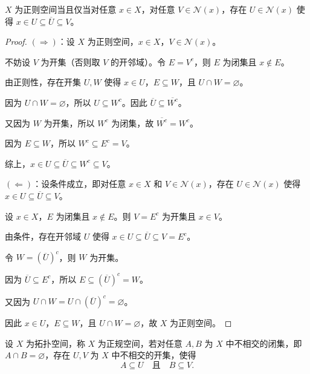 \documentclass[lang=cn,a4paper,newtx,figureplace=section,tableplace=section]{elegantbook}
\begin{document}
\begin{proposition}\label{prop:regular-characterization}
$X$ 为正则空间当且仅当对任意 $x \in X$，对任意 $V \in \mathcal{N}(x)$，存在 $U \in \mathcal{N}(x)$ 使得 $x \in U \subseteq \overline{U} \subseteq V$。
\end{proposition}
\begin{proof}
$(\Rightarrow)$：设 $X$ 为正则空间，$x \in X$，$V \in \mathcal{N}(x)$。

不妨设 $V$ 为开集（否则取 $V$ 的开邻域）。令 $E = V^c$，则 $E$ 为闭集且 $x \notin E$。

由正则性，存在开集 $U, W$ 使得 $x \in U$，$E \subseteq W$，且 $U \cap W = \varnothing$。

因为 $U \cap W = \varnothing$，所以 $U \subseteq W^c$。因此 $\overline{U} \subseteq \overline{W^c}$。

又因为 $W$ 为开集，所以 $W^c$ 为闭集，故 $\overline{W^c} = W^c$。

因为 $E \subseteq W$，所以 $W^c \subseteq E^c = V$。

综上，$x \in U \subseteq \overline{U} \subseteq W^c \subseteq V$。

$(\Leftarrow)$：设条件成立，即对任意 $x \in X$ 和 $V \in \mathcal{N}(x)$，存在 $U \in \mathcal{N}(x)$ 使得 $x \in U \subseteq \overline{U} \subseteq V$。

设 $x \in X$，$E$ 为闭集且 $x \notin E$。则 $V = E^c$ 为开集且 $x \in V$。

由条件，存在开邻域 $U$ 使得 $x \in U \subseteq \overline{U} \subseteq V = E^c$。

令 $W = (\overline{U})^c$，则 $W$ 为开集。

因为 $\overline{U} \subseteq E^c$，所以 $E \subseteq (\overline{U})^c = W$。

又因为 $U \cap W = U \cap (\overline{U})^c = \varnothing$。

因此 $x \in U$，$E \subseteq W$，且 $U \cap W = \varnothing$，故 $X$ 为正则空间。
\end{proof}

\begin{definition}[正规空间]\label{def:normal-space}
设 $X$ 为拓扑空间，称 $X$ 为正规空间，若对任意 $A, B$ 为 $X$ 中不相交的闭集，即 $A \cap B = \varnothing$，存在 $U, V$ 为 $X$ 中不相交的开集，使得
\begin{equation}
A \subseteq U \quad \text{且} \quad B \subseteq V.
\end{equation}
\end{definition}
\end{document}
